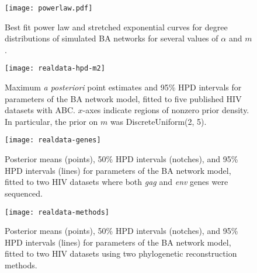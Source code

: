 \documentclass[12pt]{article}\usepackage[]{graphicx}\usepackage[]{color}
\begin{document}
\begin{figure}[ht]
    \centering
    \texttt{[image: powerlaw.pdf]}
    \caption{
        Best fit power law and stretched exponential curves for degree
        distributions of simulated BA networks for several values of $\alpha$
        and $m$.
    }
    \label{fig:powerlaw}
\end{figure}

\begin{figure}[ht]
  \texttt{[image: realdata-hpd-m2]}
  \vspace{8pt}
  \caption{
      Maximum \textit{a posteriori} point estimates and 95\% HPD intervals for
      parameters of the BA network model, fitted to five published HIV datasets
      with ABC. $x$-axes indicate regions of nonzero prior density. In
      particular, the prior on $m$ was DiscreteUniform(2, 5).
  }
  \label{fig:abchpdm2}
\end{figure}

\begin{figure}
    \centering
    \texttt{[image: realdata-genes]}
    \caption[
        Posterior means and 50\%/95\% HPD intervals for parameters of the
        BA network model, fitted to two HIV datasets where both \textit{gag}
        and \textit{env} genes were sequenced.
    ]{
        Posterior means (points), 50\% HPD intervals (notches), and 95\%
        HPD intervals (lines) for parameters of the BA network model, fitted to
        two HIV datasets where both \textit{gag} and \textit{env} genes were
        sequenced.
    }
    \label{fig:genes}
\end{figure}

\begin{figure}[ht]
    \centering
    \texttt{[image: realdata-methods]}
    \caption[
        Posterior means and 50\%/95\% HPD intervals for parameters of the
        BA network model, fitted to two HIV datasets using two phylogenetic
        reconstruction methods.
    ]{
        Posterior means (points), 50\% HPD intervals (notches), and 95\%
        HPD intervals (lines) for parameters of the BA network model, fitted to
        two HIV datasets using two phylogenetic reconstruction methods.
    }
    \label{fig:methods}
\end{figure}
\end{document}

